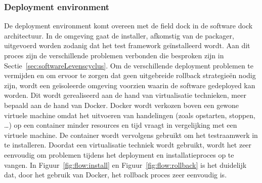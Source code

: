 \subsubsection{Deployment environment}
De deployment environment komt overeen met de field dock in de software dock architectuur.
In de omgeving gaat de installer, afkomstig van de packager, uitgevoerd worden zodanig dat het test framework geïnstalleerd wordt.
Aan dit proces zijn de verschillende problemen verbonden die besproken zijn in Sectie~\vref{sec:softwareLevenscyclus}.
Om de verschillende deployment problemen te vermijden en om ervoor te zorgen dat geen uitgebreide rollback strategieën nodig zijn, wordt een geïsoleerde omgeving voorzien waarin de software gedeployed kan worden. 
Dit wordt gerealiseerd aan de hand van virtualisatie technieken, meer bepaald aan de hand van Docker.
Docker wordt verkozen boven een gewone virtuele machine omdat het uitvoeren van handelingen (zoals opstarten, stoppen, \ldots) op een container minder resources en tijd vraagt in vergelijking met een virtuele machine.
De container wordt vervolgens gebruikt om het testraamwerk in te installeren.
Doordat een virtualisatie techniek wordt gebruikt, wordt het zeer eenvoudig om problemen tijdens het deployment en installatieproces op te vangen.
In Figuur~\vref{fig:flow:install} en Figuur~\vref{fig:flow:rollback} is het duidelijk dat, door het gebruik van Docker, het rollback proces zeer eenvoudig is.
